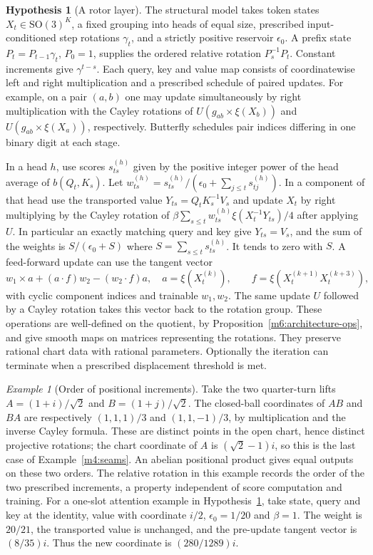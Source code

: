 \documentclass[11pt,reqno]{amsart}
\theoremstyle{definition}
\newtheorem{hypothesis}[theorem]{Hypothesis}
\theoremstyle{remark}
\newtheorem{example}[theorem]{Example}
\numberwithin{equation}{section}
\newcommand{\SO}{\mathrm{SO}}
\begin{document}
\begin{hypothesis}[A rotor layer]\label{m6:architecture}
The structural model takes token states \(X_t\in\SO(3)^K\),
a fixed grouping into heads of equal size, prescribed
input-conditioned step rotations \(\gamma_t\), and a strictly
positive reservoir \(\epsilon_0\). A prefix state
\(P_t=P_{t-1}\gamma_t\), \(P_0=1\), supplies the ordered
relative rotation \(P_s^{-1}P_t\). Constant increments give
\(\gamma^{t-s}\). Each query, key and value map consists of
coordinatewise left and right multiplication and a prescribed
schedule of paired updates. For example, on a pair \((a,b)\)
one may update simultaneously by right multiplication with
the Cayley rotations of \(U(g_{ab}\times\xi(X_b))\) and
\(U(g_{ab}\times\xi(X_a))\), respectively. Butterfly schedules
pair indices differing in one binary digit at each stage.

In a head \(h\), use scores \(s^{(h)}_{ts}\) given by the
positive integer power of the head average of \(b(Q_t,K_s)\).
Let \(w^{(h)}_{ts}=s^{(h)}_{ts}/(\epsilon_0+\sum_{j\le t}s^{(h)}_{tj})\).
In a component of that head use the transported value
\(Y_{ts}=Q_tK_s^{-1}V_s\) and update \(X_t\) by right
multiplying by the Cayley rotation of
\(\beta\sum_{s\le t} w^{(h)}_{ts}\xi(X_t^{-1}Y_{ts})/4\)
after applying \(U\). In particular an exactly matching query
and key give \(Y_{ts}=V_s\), and the sum of the weights is
\(S/(\epsilon_0+S)\) where \(S=\sum_{s\le t}s^{(h)}_{ts}\).
It tends to zero with \(S\).
A feed-forward update can use the tangent vector
\[
 w_1\times a+(a\cdot f)w_2-(w_2\cdot f)a,\quad
 a=\xi(X_t^{(k)}),\qquad f=\xi(X_t^{(k+1)}X_t^{(k+3)}),
\]
with cyclic component indices and trainable \(w_1,w_2\).
The same update \(U\) followed by a Cayley rotation takes this
vector back to the rotation group. These operations are
well-defined on the quotient, by Proposition~\ref{m6:architecture-ops},
and give smooth maps on matrices representing the rotations.
They preserve rational chart data with rational parameters.
Optionally the iteration can terminate when a prescribed
displacement threshold is met.
\end{hypothesis}

\begin{example}[Order of positional increments]\label{m6:position}
Take the two quarter-turn lifts \(A=(1+i)/\sqrt2\) and
\(B=(1+j)/\sqrt2\). The closed-ball coordinates of \(AB\) and
\(BA\) are respectively \((1,1,1)/3\) and \((1,1,-1)/3\),
by multiplication and the inverse Cayley formula.
These are distinct points in the open chart, hence distinct
projective rotations; the chart coordinate of \(A\) is \((\sqrt2-1)i\), so this is the last case of Example~\ref{m4:seams}. An abelian positional product gives
equal outputs on these two orders. The relative rotation in
this example records the order of the two prescribed increments,
a property independent of score computation and training.
For a one-slot attention example in Hypothesis~\ref{m6:architecture},
take state, query and key at the identity, value with coordinate
\(i/2\), \(\epsilon_0=1/20\) and \(\beta=1\).
The weight is \(20/21\), the transported value is unchanged,
and the pre-update tangent vector is \((8/35)i\).
Thus the new coordinate is \((280/1289)i\).
\end{example}
\end{document}
